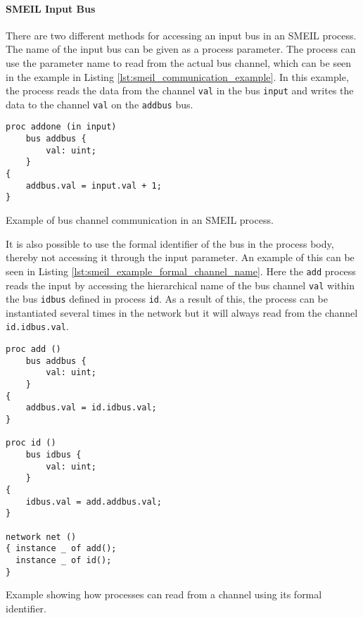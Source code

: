 \paragraph{SMEIL Input Bus}
There are two different methods for accessing an input bus in an SMEIL process. The name of the input bus can be given as a process parameter. The process can use the parameter name to read from the actual bus channel, which can be seen in the example in Listing \ref{lst:smeil_communication_example}. In this example, the process reads the data from the channel \texttt{val} in the bus \texttt{input} and writes the data to the channel \texttt{val} on the \texttt{addbus} bus.
\begin{listing}
\begin{verbatim}
proc addone (in input)
    bus addbus {
        val: uint;
    }
{
    addbus.val = input.val + 1;
}
\end{verbatim}
\caption{Example of bus channel communication in an SMEIL process.}
\label{lst:smeil_communication_example}
\end{listing}

It is also possible to use the formal identifier of the bus in the process body, thereby not accessing it through the input parameter. An example of this can be seen in Listing \ref{lst:smeil_example_formal_channel_name}. Here the \texttt{add} process reads the input by accessing the hierarchical name of the bus channel \texttt{val} within the bus \texttt{idbus} defined in process \texttt{id}. As a result of this, the process can be instantiated several times in the network but it will always read from the channel \texttt{id.idbus.val}.
\begin{listing}
\begin{verbatim}
proc add ()
    bus addbus {
        val: uint;
    }
{
    addbus.val = id.idbus.val;
}

proc id ()
    bus idbus {
        val: uint;
    }
{
    idbus.val = add.addbus.val;
}

network net ()
{ instance _ of add();
  instance _ of id();
}
\end{verbatim}
\caption{Example showing how processes can read from a channel using its formal identifier.}
\label{lst:smeil_example_formal_channel_name}
\end{listing}

